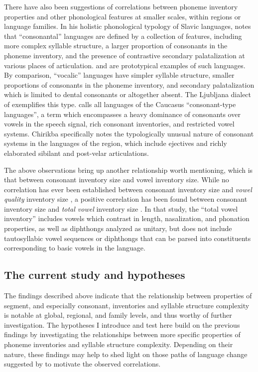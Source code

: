   There have also been suggestions of correlations between phoneme inventory properties and other phonological features at smaller scales, within regions or language families. In his holistic phonological typology of Slavic languages, \citet{Isačenko1939/1940} notes that ``consonantal'' languages are defined by a collection of features, including more complex syllable structure, a larger proportion of consonants in the phoneme inventory, and the presence of contrastive secondary palatalization at various places of articulation.  and  are prototypical examples of such languages. By comparison, ``vocalic'' languages have simpler syllable structure, smaller proportions of consonants in the phoneme inventory, and secondary palatalization which is limited to dental consonants or altogether absent. The Ljubljana dialect of  exemplifies this type. \citet[43]{Chirikba2008} calls all languages of the Caucasus “consonant-type languages”, a term which encompasses a heavy dominance of consonants over vowels in the speech signal, rich consonant inventories, and restricted vowel systems. Chirikba specifically notes the typologically unusual nature of consonant systems in the languages of the region, which include ejectives and richly elaborated sibilant and post-velar articulations.

  The above observations bring up another relationship worth mentioning, which is that between consonant inventory size and vowel inventory size. While no correlation has ever been established between consonant inventory size and \textit{vowel quality} inventory size \citep{Maddieson2013c}, a positive correlation has been found between consonant inventory size and \textit{total vowel} inventory size \citep{Maddieson2011}. In that study, the ``total vowel inventory'' includes vowels which contrast in length, nasalization, and phonation properties, as well as diphthongs analyzed as unitary, but does not include tautosyllabic vowel sequences or diphthongs that can be parsed into constituents corresponding to basic vowels in the language.

\subsection{The current study and hypotheses}\label{sec:4.1.4}

  The findings described above indicate that the relationship between properties of segment, and especially consonant, inventories and syllable structure complexity is notable at global, regional, and family levels, and thus worthy of further investigation. The hypotheses I introduce and test here build on the previous findings by investigating the relationships between more specific properties of phoneme inventories and syllable structure complexity. Depending on their nature, these findings may help to shed light on those paths of language change suggested by \citet{Maddieson2006} to motivate the observed correlations.

